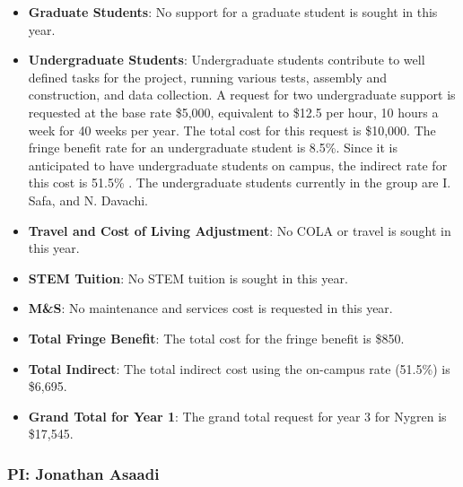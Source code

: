 \begin{enumerate}
\begin{itemize}[noitemsep,nolistsep]
\item{{\bf Graduate Students}: No support for a graduate student is sought in this year.}

\item {{\bf Undergraduate Students}: Undergraduate students contribute to well defined tasks for the project, running various tests, assembly and construction, and data collection.  A request for two undergraduate support is requested at the base rate \$5,000, equivalent to \$12.5 per hour, 10 hours a week for 40 weeks per year.  The total cost for this request is \$10,000.  The fringe benefit rate for an undergraduate student is 8.5\%.  Since it is anticipated to have undergraduate students on campus, the indirect rate for this cost is 51.5\% .  The undergraduate students currently in the group are I. Safa, and N. Davachi.}

\item{{\bf Travel and Cost of Living Adjustment}: No COLA or travel is sought in this year.}

\item {{\bf STEM Tuition}: No STEM tuition is sought in this year.}

\item {{\bf M\&S}: No maintenance and services cost is requested in this year.}

\item {{\bf Total Fringe Benefit}: The total cost for the fringe benefit is \$850.}

\item {{\bf Total Indirect}: The total indirect cost using the on-campus rate (51.5\%) is \$6,695.}

\item {{\bf Grand Total for Year 1}: The grand total request for year 3 for Nygren is \$17,545.}

\end{itemize}

\end{enumerate}




\newpage

\subsubsection{\bf PI: Jonathan Asaadi}

